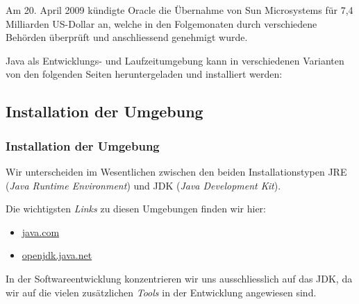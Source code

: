 Am 20. April 2009 kündigte Oracle die Übernahme von Sun Microsystems für
7,4 Milliarden US-Dollar an, welche in den Folgemonaten durch verschiedene
Behörden überprüft und anschliessend genehmigt wurde.

Java als Entwicklungs- und Laufzeitumgebung kann in verschiedenen Varianten
von den folgenden Seiten heruntergeladen und installiert werden:


\subsection{Installation der Umgebung}
\label{subsec:installation}

\begin{frame}[fragile]
    \frametitle<presentation>{Installation der Umgebung}

    Wir unterscheiden im Wesentlichen zwischen den beiden Installationstypen
    JRE ({\em Java Runtime Environment}) und JDK ({\em Java
    Development Kit}).

    Die wichtigsten {\em Links} zu diesen Umgebungen finden wir hier:

    \begin{itemize}
        \item \href{https://java.com}{java.com}
        \item \href{https://openjdk.java.net}{openjdk.java.net}
    \end{itemize}

\end{frame}

In der Softwareentwicklung konzentrieren wir uns ausschliesslich auf das JDK,
da wir auf die vielen zusätzlichen {\em Tools} in der Entwicklung angewiesen
sind.


